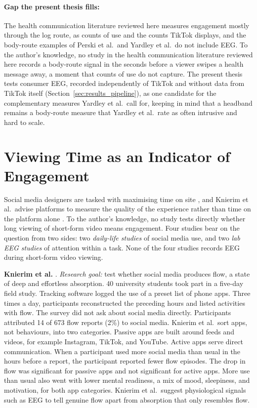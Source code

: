 \documentclass[12pt,a4paper]{report}
\begin{document}
\paragraph{Gap the present thesis fills:} The health communication literature reviewed here measures engagement mostly through the log route, as counts of use and the counts TikTok displays, and the body-route examples of Perski et al.\ and Yardley et al.\ do not include EEG. To the author's knowledge, no study in the health communication literature reviewed here records a body-route signal in the seconds before a viewer swipes a health message away, a moment that counts of use do not capture. The present thesis tests consumer EEG, recorded independently of TikTok and without data from TikTok itself (Section~\ref{sec:results_pipeline}), as one candidate for the complementary measures Yardley et al.\ call for, keeping in mind that a headband remains a body-route measure that Yardley et al.\ rate as often intrusive and hard to scale.

\section{Viewing Time as an Indicator of Engagement}
\label{sec:engagement_short_form}
Social media designers are tasked with maximising time on site \cite{baughan_i_2022}, and Knierim et al.\ advise platforms to measure the quality of the experience rather than time on the platform alone \cite{knierim_flow_2026}. To the author's knowledge, no study tests directly whether long viewing of short-form video means engagement. Four studies bear on the question from two sides: two \emph{daily-life studies} of social media use, and two \emph{lab EEG studies} of attention within a task. None of the four studies records EEG during short-form video viewing.

\textbf{Knierim et al.} \cite{knierim_flow_2026}. \emph{Research goal:} test whether social media produces flow, a state of deep and effortless absorption. 40 university students took part in a five-day field study. Tracking software logged the use of a preset list of phone apps. Three times a day, participants reconstructed the preceding hours and listed activities with flow. The survey did not ask about social media directly. Participants attributed 14 of 673 flow reports (2\%) to social media. Knierim et al.\ sort apps, not behaviours, into two categories. Passive apps are built around feeds and videos, for example Instagram, TikTok, and YouTube. Active apps serve direct communication. When a participant used more social media than usual in the hours before a report, the participant reported fewer flow episodes. The drop in flow was significant for passive apps and not significant for active apps. More use than usual also went with lower mental readiness, a mix of mood, sleepiness, and motivation, for both app categories. Knierim et al.\ suggest physiological signals such as EEG to tell genuine flow apart from absorption that only resembles flow.
\end{document}
